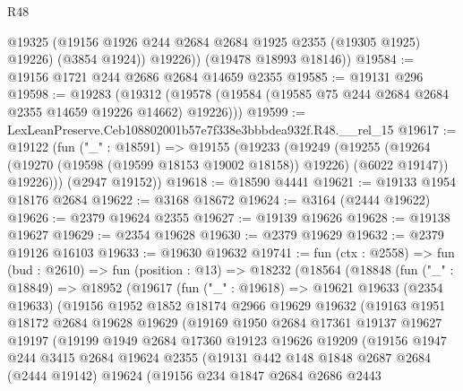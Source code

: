 \begin{lexlean}{R48}
\begin{coremodule}
            @19325
            (@19156 @1926 @244 @2684 @2684 @1925 @2355 (@19305 @1925) @19226)
            (@3854 @1924))
          @19226))
      (@19478 @18993 @18146))
@19584 := @19156 @1721 @244 @2686 @2684 @14659 @2355
@19585 := @19131 @296
@19598 := @19283
    (@19312 (@19578 (@19584 (@19585 @75 @244 @2684 @2684 @2355 @14659 @19226 @14662) @19226)))
@19599 := LexLeanPreserve.Ceb108802001b57e7f338e3bbbdea932f.R48.__rel_15
@19617 := @19122
    (fun ("_" : @18591) =>
    @19155
      (@19233
        (@19249
          (@19255
            (@19264 (@19270 (@19598 (@19599 @18153 @19002 @18158)) @19226) (@6022 @19147))
            @19226)))
      (@2947 @19152))
@19618 := @18590 @4441
@19621 := @19133 @1954 @18176 @2684
@19622 := @3168 @18672
@19624 := @3164 (@2444 @19622)
@19626 := @2379 @19624 @2355
@19627 := @19139 @19626
@19628 := @19138 @19627
@19629 := @2354 @19628
@19630 := @2379 @19629
@19632 := @2379 @19126 @16103
@19633 := @19630 @19632
@19741 := fun (ctx : @2558) =>
  fun (bud : @2610) =>
  fun (position : @13) =>
  @18232
    (@18564
      (@18848
        (fun ("_" : @18849) =>
        @18952
          (@19617
            (fun ("_" : @19618) =>
            @19621
              @19633
              (@2354 @19633)
              (@19156
                @1952
                @1852
                @18174
                @2966
                @19629
                @19632
                (@19163
                  @1951
                  @18172
                  @2684
                  @19628
                  @19629
                  (@19169
                    @1950
                    @2684
                    @17361
                    @19137
                    @19627
                    @19197
                    (@19199
                      @1949
                      @2684
                      @17360
                      @19123
                      @19626
                      @19209
                      (@19156
                        @1947
                        @244
                        @3415
                        @2684
                        @19624
                        @2355
                        (@19131
                          @442
                          @148
                          @1848
                          @2687
                          @2684
                          (@2444 @19142)
                          @19624
                          (@19156
                            @234
                            @1847
                            @2684
                            @2686
                            @2443

\end{coremodule}
\end{lexlean}
